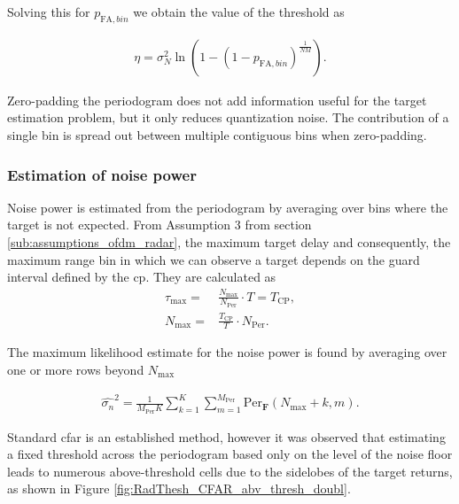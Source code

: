				Solving this for $p_{\text{FA},bin}$ we obtain the value of the threshold as 
				
				\begin{align*}
					\eta = \sigma_N^2 \ln{(1 - (1 - p_{\text{FA},bin})^{\frac{1}{NM}})}.
				\end{align*}
				
				Zero-padding the periodogram does not add information useful for the target estimation problem, but it only reduces quantization noise. The contribution of a single bin is spread out between multiple contiguous bins when zero-padding.

				\subsubsection{Estimation of noise power}
	
					Noise power is estimated from the periodogram by averaging over bins where the target is not expected.
					From Assumption 3 from section \ref{sub:assumptions_ofdm_radar}, the maximum target delay and consequently, the maximum range bin in which we can observe a target depends on the guard interval defined by the \gls{cp}. They are calculated as 
					\begin{align*}
						\tau_{\text{max}} =& \frac{N_{\text{max}}}{N_{\text{Per}}}\cdot T = T_\text{CP} ,\\
						N_{\text{max}} =& \frac{T_\text{CP}}{T}\cdot N_{\text{Per}}.
					\end{align*} 
					
					The maximum likelihood estimate for the noise power is found by averaging over one or more rows beyond $N_{\text{max}}$
			
					\begin{align}
					\label{align: threshold_noise_power}
						\hat{\sigma_n}^2 = \frac{1}{M_{\text{Per}}K} \sum_{k=1}^K \sum_{m=1}^{M_{\text{Per}}} \text{Per}_{\bm{F}}(N_{\text{max}}+k, m).
					\end{align}
			
			Standard \gls{cfar} is an established method, however it was observed that estimating a fixed threshold across the periodogram based only on the level of the noise floor leads to  numerous above-threshold cells due to the sidelobes of the target returns, as shown in Figure \ref{fig:RadThesh_CFAR_abv_thresh_doubl}.
			

